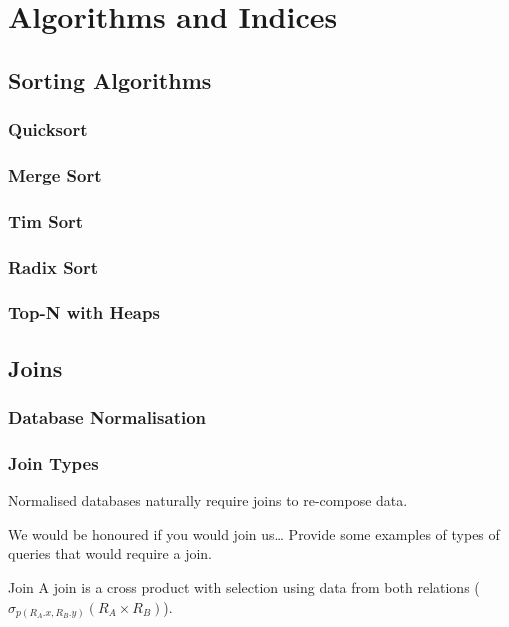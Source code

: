 \chapter{Algorithms and Indices}

\section{Sorting Algorithms}
\subsection{Quicksort}
\subsection{Merge Sort}
\subsection{Tim Sort}
\subsection{Radix Sort}
\subsection{Top-N with Heaps}

\unfinished

\section{Joins}
\subsection{Database Normalisation}
\unfinished

\subsection{Join Types}
Normalised databases naturally require joins to re-compose data.

\begin{examplebox}{We would be honoured if you would join us\dots}
    Provide some examples of types of queries that would require a join.
    \tcblower
    \unfinished
\end{examplebox}

\begin{definitionbox}{Join}
    A join is a cross product with selection using data from both relations ($\sigma_{p(R_A.x, R_B.y)} (R_A \times R_B)$).
\end{definitionbox}

